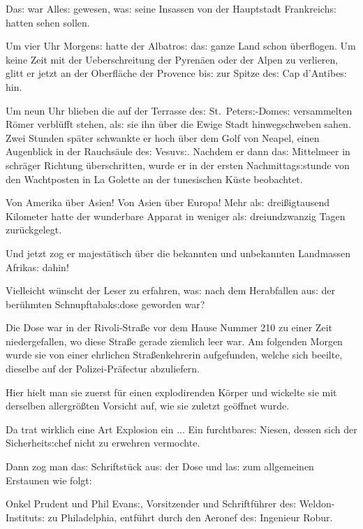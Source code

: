 \documentclass[oneside,12pt]{book}
\newcommand{\s}{s:}
\begin{document}
Da{\s} war Alle{\s} gewesen, wa{\s} seine Insassen von der Hauptstadt
Frankreich{\s} hatten sehen sollen.

Um vier Uhr Morgen{\s} hatte der {\glqq}Albatro{\s}{\grqq} da{\s}
ganze Land schon \"uberflogen. Um keine Zeit mit der Ueberschreitung
der Pyren\"aen oder der Alpen zu verlieren, glitt er jetzt an der
Oberfl\"ache der Provence bi{\s} zur Spitze de{\s} Cap d'Antibe{\s} hin.

Um neun Uhr blieben die auf der Terrasse de{\s} St.~Peter{\s}-Dome{\s}
versammelten R\"omer verbl\"ufft stehen, al{\s} sie ihn \"uber die
Ewige Stadt hinwegschweben sahen. Zwei Stunden sp\"ater schwankte er
hoch \"uber dem Golf von Neapel, einen Augenblick in der Rauchs\"aule
de{\s} Vesuv{\s}. Nachdem er dann da{\s} Mittelmeer in schr\"ager
Richtung \"uberschritten, wurde er in der ersten Nachmittag{\s}stunde
von den Wachtposten in La Golette an der tunesischen K\"uste
beobachtet.

Von Amerika \"uber Asien! Von Asien \"uber Europa! Mehr al{\s}
drei{\ss}igtausend Kilometer hatte der wunderbare Apparat in weniger
al{\s} dreiundzwanzig Tagen zur\"uckgelegt.

Und jetzt zog er majest\"atisch \"uber die bekannten und unbekannten
Landmassen Afrika{\s} dahin!

\begin{center}
\makebox[15em]{\hrulefill}\bigskip
\end{center}

Vielleicht w\"unscht der Leser zu erfahren, wa{\s} nach dem
Herabfallen au{\s} der ber\"uhmten Schnupf\-tabak{\s}\-dose geworden
war?

Die Dose war in der Rivoli-Stra{\ss}e vor dem Hause Nummer 210 zu
einer Zeit niedergefallen, wo diese Stra{\ss}e gerade ziemlich leer
war. Am folgenden Morgen wurde sie von einer ehrlichen
Stra{\ss}enkehrerin aufgefunden, welche sich beeilte, dieselbe auf
der Polizei-Pr\"afectur abzuliefern.

Hier hielt man sie zuerst f\"ur einen explodirenden K\"orper und
wickelte sie mit derselben allergr\"o{\ss}ten Vorsicht auf, wie sie
zuletzt ge\"offnet wurde.

Da trat wirklich eine Art Explosion ein ... Ein furchtbare{\s}
Niesen, dessen sich der Sicherheit{\s}chef nicht zu erwehren
vermochte.

Dann zog man da{\s} Schriftst\"uck au{\s} der Dose und la{\s} zum
allgemeinen Erstaunen wie folgt:
\bigskip

{\glqq}Onkel Prudent und Phil Evan{\s}, Vorsitzender und
Schriftf\"uhrer de{\s} Weldon-Institut{\s} zu Philadelphia,
entf\"uhrt durch den Aeronef de{\s} Ingenieur Robur.
\end{document}
